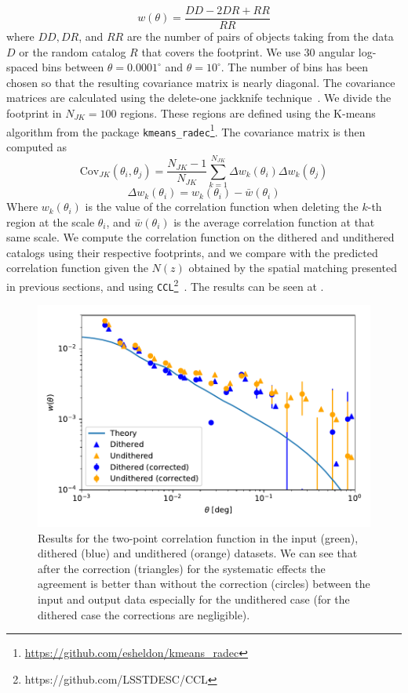 \documentclass[\docopts]{\docclass}
\begin{document}
\begin{equation}
w(\theta) = \frac{DD - 2 DR + RR}{RR}
\end{equation} 
where $DD, DR$, and $RR$ are the number of pairs of objects taking from the data $D$ or the random catalog $R$ that covers the footprint. We use 30 angular log-spaced bins between $\theta=0.0001^{\circ}$ and $\theta=10^{\circ}$. The number of bins has been chosen so that the resulting covariance matrix is nearly diagonal. The covariance matrices are calculated using the delete-one jackknife technique~\citep{Shao:1986:DJB,2009MNRAS.396...19N}. We divide the footprint in $N_{JK}=100$ regions. These regions are defined using the K-means algorithm from the package \texttt{kmeans\_radec}\footnote{\url{https://github.com/esheldon/kmeans\_radec}}. The covariance matrix is then computed as
\begin{equation}
\mathrm{Cov}_{JK}(\theta_{i},\theta_{j})=\frac{N_{JK}-1}{N_{JK}}\sum_{k=1}^{N_{JK}}\Delta w_{k}(\theta_{i}) \Delta w_{k}(\theta_{j})
\end{equation}
\begin{equation}
\Delta w_{k}(\theta_{i}) = w_{k}(\theta_{i})-\bar{w}(\theta_{i})
\end{equation}
Where $w_{k}(\theta_{i})$ is the value of the correlation function when deleting the $k$-th region at the scale $\theta_{i}$, and $\bar{w}(\theta_{i})$ is the average correlation function at that same scale. We compute the correlation function on the dithered and undithered catalogs using their respective footprints, and we compare with the predicted correlation function given the $N(z)$ obtained by the spatial matching presented in previous sections, and using \texttt{CCL}\footnote{https://github.com/LSSTDESC/CCL}~\citep{CCL}. The results can be seen at . 

\begin{figure}
\centering
\includegraphics[width=0.9\columnwidth]{w_comp_corr25p3.pdf}
\caption{Results for the two-point correlation function in the input (green), dithered (blue) and undithered (orange) datasets. We can see that after the correction (triangles) for the systematic effects the agreement is better than without the correction (circles) between the input and output data especially for the undithered case (for the dithered case the corrections are negligible).} 
\label{fig:2pt_corr}
\end{figure}
\end{document}
